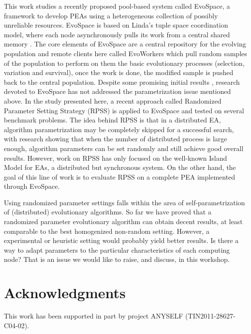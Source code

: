 \documentclass{llncs}
\begin{document}
This work studies a recently proposed pool-based system called EvoSpace, a framework to develop PEAs using 
a heterogeneous collection of possibly unreliable resources.
EvoSpace is based on Linda's tuple space coordination model, where each node asynchronously
pulls its work from a central shared memory  \cite{Evospace,Musart,FreeLunch,Fire}. The core elements of EvoSpace are a central 
repository for the evolving population and remote clients here called EvoWorkers
which pull random samples of the population to perform on them the basic evolutionary
processes (selection, variation and survival), once the work is done, the
modified sample is pushed back to the central population.
Despite some promising initial results \cite{Evospace,Musart,FreeLunch,Fire}, research devoted to EvoSpace has not addressed the parametrization issue mentioned above.
In the study presented here, a recent approach called Randomized Parameter Setting Strategy (RPSS) \cite{fuku1,fuku2} is applied to EvoSpace and tested on several
benchmark problems.
The idea behind RPSS is that in a distributed EA, algorithm parametrization may be completely skipped for a successful search,
with research showing that when the number of distributed process is large enough, algorithm parameters can be set randomly and still achieve
good overall results.
However, work on RPSS has only focused on the well-known Island Model for EAs, a distributed but synchronous system.
On the other hand, the goal of this line of work is to evaluate RPSS on a
complete PEA implemented through EvoSpace.

Using randomized parameter settings falls within the area of
self-parametrization of (distributed) evolutionary algorithms. So far
we have proved that a randomized parameter evolutionary algorithm can
obtain decent results, at least comparable to the best homogenized
non-random setting. However, a experimental or heuristic setting would
probably yield better results. Is there a way to adapt parameters to
the particular characteristics of each computing node? That is an
issue we would like to raise, and discuss, in this workshop. 



\section{Acknowledgments}

This work has been supported in part by project ANYSELF
(TIN2011-28627-C04-02). 

%


\end{document}
